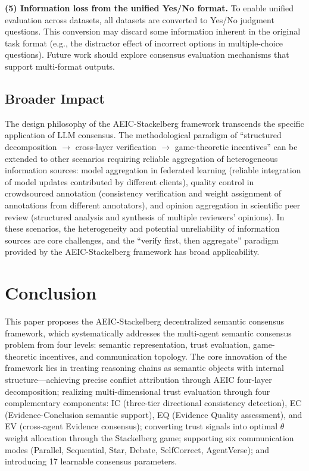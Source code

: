 \documentclass[12pt,a4paper]{article}
\begin{document}
\textbf{(5) Information loss from the unified Yes/No format.} To enable unified evaluation across datasets, all datasets are converted to Yes/No judgment questions. This conversion may discard some information inherent in the original task format (e.g., the distractor effect of incorrect options in multiple-choice questions). Future work should explore consensus evaluation mechanisms that support multi-format outputs.

\subsection{Broader Impact}

The design philosophy of the AEIC-Stackelberg framework transcends the specific application of LLM consensus. The methodological paradigm of ``structured decomposition $\to$ cross-layer verification $\to$ game-theoretic incentives'' can be extended to other scenarios requiring reliable aggregation of heterogeneous information sources: model aggregation in federated learning (reliable integration of model updates contributed by different clients), quality control in crowdsourced annotation (consistency verification and weight assignment of annotations from different annotators), and opinion aggregation in scientific peer review (structured analysis and synthesis of multiple reviewers' opinions). In these scenarios, the heterogeneity and potential unreliability of information sources are core challenges, and the ``verify first, then aggregate'' paradigm provided by the AEIC-Stackelberg framework has broad applicability.

\section{Conclusion}\label{sec:conclusion}

This paper proposes the AEIC-Stackelberg decentralized semantic consensus framework, which systematically addresses the multi-agent semantic consensus problem from four levels: semantic representation, trust evaluation, game-theoretic incentives, and communication topology. The core innovation of the framework lies in treating reasoning chains as semantic objects with internal structure---achieving precise conflict attribution through AEIC four-layer decomposition; realizing multi-dimensional trust evaluation through four complementary components: IC (three-tier directional consistency detection), EC (Evidence-Conclusion semantic support), EQ (Evidence Quality assessment), and EV (cross-agent Evidence consensus); converting trust signals into optimal $\theta$ weight allocation through the Stackelberg game; supporting six communication modes (Parallel, Sequential, Star, Debate, SelfCorrect, AgentVerse); and introducing 17 learnable consensus parameters.
\end{document}
